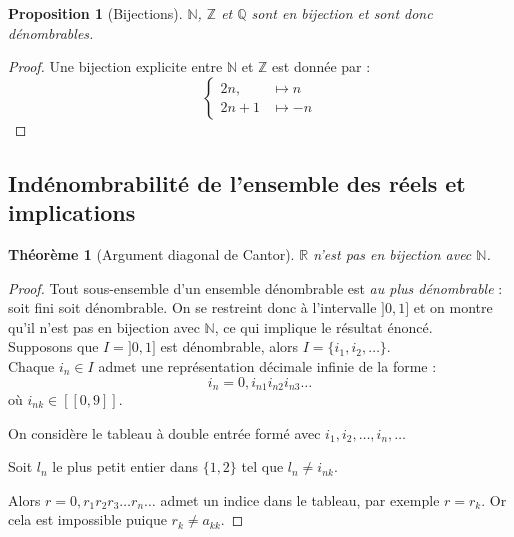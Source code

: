 \documentclass{article}
\theoremstyle{definition}
\theoremstyle{plain}
\newtheorem{proposition}[subsubsection]{Proposition}
\newtheorem{theorem}[subsubsection]{Théorème}
\theoremstyle{plain}
\theoremstyle{plain}
\theoremstyle{plain}
\theoremstyle{plain}
\begin{document}
\begin{proposition}[Bijections]
	\( \mathbb{N} \), \( \mathbb{Z} \) et \( \mathbb{Q} \) sont en bijection et sont donc dénombrables. \cite{tao2014analysis}
\end{proposition}
\begin{proof}
	Une bijection explicite entre \( \mathbb{N} \) et \( \mathbb{Z} \) est donnée par :
	\[
		\begin{cases}
			2n, & \mapsto n \\
			2n + 1 & \mapsto -n
		\end{cases}
	\]
\end{proof}

\subsection{Indénombrabilité de l'ensemble des réels et implications}

\begin{theorem}[Argument diagonal de Cantor]
	\( \mathbb{R} \) n'est pas en bijection avec \( \mathbb{N} \). \cite{aigner2018proofs} \cite{dehornoy2017théorie}
\end{theorem}
\begin{proof}
	Tout sous-ensemble d'un ensemble dénombrable est \textit{au plus dénombrable} : soit fini soit dénombrable. On se restreint donc à l'intervalle \( ]0,1] \) et on montre qu'il n'est pas en bijection avec \( \mathbb{N} \), ce qui implique le résultat énoncé. \\
	Supposons que \( I = ]0,1] \) est dénombrable, alors \( I = \{i_{1}, i_{2}, \ldots \} \). \\ 
	Chaque \( i_{n} \in I \) admet une représentation décimale infinie de la forme :
	\begin{equation*}
		i_{n} = 0,i_{n1}i_{n2}i_{n3}\ldots 
	\end{equation*}
	où \( i_{nk} \in [\![0,9]\!] \).

	On considère le tableau à double entrée formé avec \( i_{1}, i_{2}, \ldots, i_{n}, \ldots \) 

	Soit \( l_{n} \) le plus petit entier dans \( \{1,2\}\) tel que \( l_{n} \neq i_{nk}\). 

	Alors \( r = 0,r_{1}r_{2}r_{3} \ldots r_{n}\ldots \) admet un indice dans le tableau, par exemple \( r = r_{k} \). Or cela est impossible puique \( r_{k} \neq a_{kk} \).
	
\end{proof}
\end{document}
